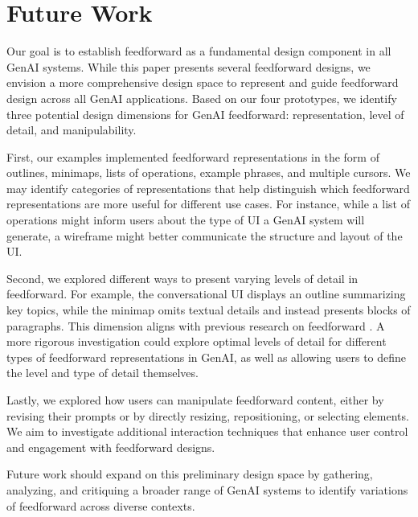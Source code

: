 \section{Future Work}
\label{section:discussion}


Our goal is to establish feedforward as a fundamental design component in all GenAI systems. While this paper presents several feedforward designs, we envision a more comprehensive design space to represent and guide feedforward design across all GenAI applications. Based on our four prototypes, we identify three potential design dimensions for GenAI feedforward: representation, level of detail, and manipulability.

First, our examples implemented feedforward representations in the form of outlines, minimaps, lists of operations, example phrases, and multiple cursors. We may identify categories of representations that help distinguish which feedforward representations are more useful for different use cases. For instance, while a list of operations might inform users about the type of UI a GenAI system will generate, a wireframe might better communicate the structure and layout of the UI.

Second, we explored different ways to present varying levels of detail in feedforward. For example, the conversational UI displays an outline summarizing key topics, while the minimap omits textual details and instead presents blocks of paragraphs. This dimension aligns with previous research on feedforward \cite{bau2008octopocus}. A more rigorous investigation could explore optimal levels of detail for different types of feedforward representations in GenAI, as well as allowing users to define the level and type of detail themselves.

Lastly, we explored how users can manipulate feedforward content, either by revising their prompts or by directly resizing, repositioning, or selecting elements. We aim to investigate additional interaction techniques that enhance user control and engagement with feedforward designs.

Future work should expand on this preliminary design space by gathering, analyzing, and critiquing a broader range of GenAI systems to identify variations of feedforward across diverse contexts.

